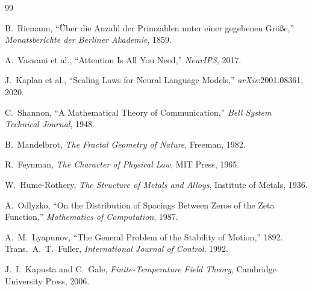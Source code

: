 \documentclass[11pt,twoside]{article}
\theoremstyle{plain}
\theoremstyle{definition}
\theoremstyle{remark}
\begin{document}
\newpage
\begin{thebibliography}{99}

B.\ Riemann, ``\"{U}ber die Anzahl der Primzahlen unter einer gegebenen
Gr\"{o}\ss{}e,'' \textit{Monatsberichte der Berliner Akademie}, 1859.

A.\ Vaswani et al., ``Attention Is All You Need,'' \textit{NeurIPS}, 2017.

J.\ Kaplan et al., ``Scaling Laws for Neural Language Models,''
\textit{arXiv}:2001.08361, 2020.

C.\ Shannon, ``A Mathematical Theory of Communication,''
\textit{Bell System Technical Journal}, 1948.

B.\ Mandelbrot, \textit{The Fractal Geometry of Nature}, Freeman, 1982.

R.\ Feynman, \textit{The Character of Physical Law}, MIT Press, 1965.

W.\ Hume-Rothery, \textit{The Structure of Metals and Alloys},
Institute of Metals, 1936.

A.\ Odlyzko, ``On the Distribution of Spacings Between Zeros of the Zeta
Function,'' \textit{Mathematics of Computation}, 1987.

A.\ M.\ Lyapunov, ``The General Problem of the Stability of Motion,''
1892. Trans.\ A.\ T.\ Fuller, \textit{International Journal of Control}, 1992.

J.\ I.\ Kapusta and C.\ Gale, \textit{Finite-Temperature Field Theory},
Cambridge University Press, 2006.

\end{thebibliography}
\end{document}
